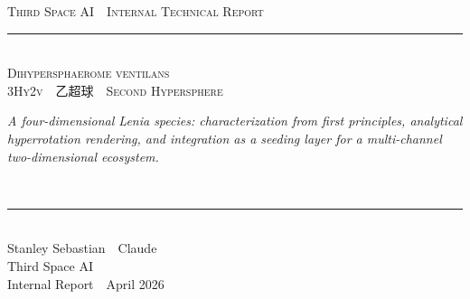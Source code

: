 \documentclass[11pt,a4paper]{article}
\begin{document}
\thispagestyle{empty}
\vspace*{1.2cm}

\begin{center}
  {\sffamily\footnotesize\textcolor{muted}{\textsc{Third Space AI \,\textperiodcentered\, Internal Technical Report}}}\\[28pt]

  {\color{rule}\rule{0.3\linewidth}{0.3pt}}\\[26pt]

  {\fontsize{30}{34}\selectfont\scshape\color{headinc}
    Dihypersphaerome ventilans}\\[12pt]
  {\LARGE\color{accent}\scshape{3\textsc{Hy}2v \,\textperiodcentered\, 乙超球 \,\textperiodcentered\, Second Hypersphere}}\\[22pt]

  \begin{minipage}{0.82\linewidth}
    \centering\itshape\large\color{headinc}
    A four-dimensional Lenia species: characterization from first principles,
    analytical hyperrotation rendering, and integration as a seeding layer
    for a multi-channel two-dimensional ecosystem.
  \end{minipage}\\[32pt]

  {\color{rule}\rule{0.3\linewidth}{0.3pt}}\\[32pt]

  {\large Stanley Sebastian \,\textperiodcentered\, Claude}\\[4pt]
  {\sffamily\small\textcolor{muted}{Third Space AI}}\\[18pt]
  {\sffamily\footnotesize\textcolor{muted}{Internal Report \,\textperiodcentered\, April 2026}}
\end{center}

\vfill
\end{document}
